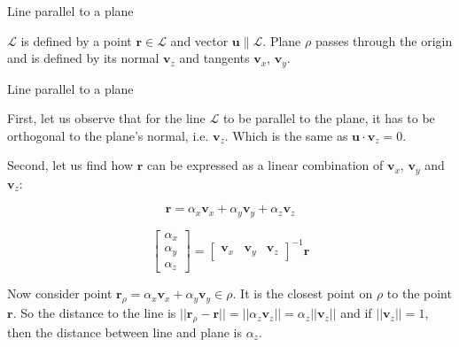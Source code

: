 \documentclass{beamer}
\begin{document}
\begin{frame}{Line parallel to a plane}
\begin{flushleft}
		
		$\mathcal{L}$ is defined by a point $\mathbf r \in \mathcal{L}$ and vector $\mathbf u \parallel \mathcal{L}$. Plane $\rho$ passes through the origin and is defined by its normal $\mathbf v_z$ and tangents $\mathbf v_x$, $\mathbf v_y$.
		
	\end{flushleft}
\end{frame}


\begin{frame}{Line parallel to a plane}
	\begin{flushleft}
		
		First, let us observe that for the line $\mathcal{L}$ to be parallel to the plane, it has to be orthogonal to the plane's normal, i.e. $\mathbf v_z$. Which is the same as $\mathbf u \cdot \mathbf v_z = 0$.
		
		\bigskip
		
		Second, let us find how $\mathbf r$ can be expressed as a linear combination of $\mathbf v_x$, $\mathbf v_y$ and $\mathbf v_z$:
		
		\begin{equation}
			\mathbf r = \alpha_x \mathbf v_x + \alpha_y \mathbf v_y + \alpha_z \mathbf v_z
		\end{equation}
		
		\begin{equation}
			\begin{bmatrix}
				\alpha_x \\ \alpha_y \\ \alpha_z
			\end{bmatrix}
			=
			\begin{bmatrix}
				\mathbf v_x &  \mathbf v_y &  \mathbf v_z
			\end{bmatrix}^{-1}
			\mathbf r
		\end{equation}
	
		Now consider point $\mathbf r_\rho = \alpha_x \mathbf v_x + \alpha_y \mathbf v_y \in \rho$. It is the closest point on $\rho$ to the point $\mathbf r$. So the distance to the line is $||\mathbf r_\rho - \mathbf r || = || \alpha_z \mathbf v_z || = \alpha_z || \mathbf v_z ||$ and if $|| \mathbf v_z || = 1$, then the distance between line and plane is $ \alpha_z$.
		
	\end{flushleft}
\end{frame}
\end{document}
